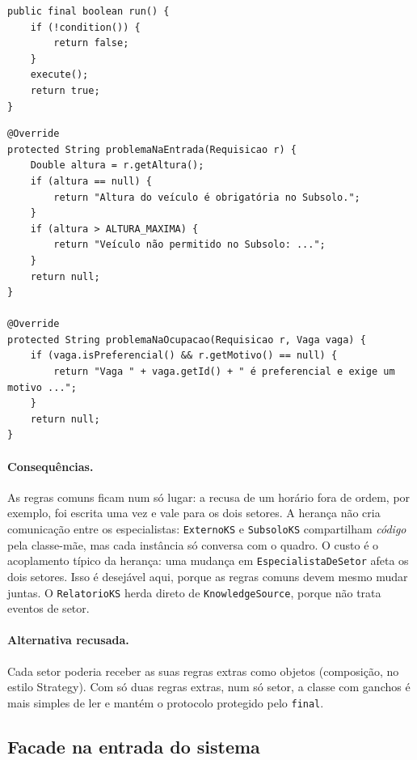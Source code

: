 \begin{lstlisting}[caption={O método-modelo (\texttt{KnowledgeSource.java}).},label=cod:run]
public final boolean run() {
    if (!condition()) {
        return false;
    }
    execute();
    return true;
}
\end{lstlisting}

\begin{lstlisting}[caption={Os ganchos do Subsolo (\texttt{SubsoloKS.java}, resumido).},label=cod:ganchos]
@Override
protected String problemaNaEntrada(Requisicao r) {
    Double altura = r.getAltura();
    if (altura == null) {
        return "Altura do veículo é obrigatória no Subsolo.";
    }
    if (altura > ALTURA_MAXIMA) {
        return "Veículo não permitido no Subsolo: ...";
    }
    return null;
}

@Override
protected String problemaNaOcupacao(Requisicao r, Vaga vaga) {
    if (vaga.isPreferencial() && r.getMotivo() == null) {
        return "Vaga " + vaga.getId() + " é preferencial e exige um motivo ...";
    }
    return null;
}
\end{lstlisting}

\paragraph{Consequências.} As regras comuns ficam num só lugar: a recusa de um horário fora de ordem, por exemplo, foi escrita uma vez e vale para os dois setores. A herança não cria comunicação entre os especialistas: \texttt{ExternoKS} e \texttt{SubsoloKS} compartilham \emph{código} pela classe-mãe, mas cada instância só conversa com o quadro. O custo é o acoplamento típico da herança: uma mudança em \texttt{EspecialistaDeSetor} afeta os dois setores. Isso é desejável aqui, porque as regras comuns devem mesmo mudar juntas. O \texttt{RelatorioKS} herda direto de \texttt{KnowledgeSource}, porque não trata eventos de setor.

\paragraph{Alternativa recusada.} Cada setor poderia receber as suas regras extras como objetos (composição, no estilo Strategy). Com só duas regras extras, num só setor, a classe com ganchos é mais simples de ler e mantém o protocolo protegido pelo \texttt{final}.

\subsection{Facade na entrada do sistema}

